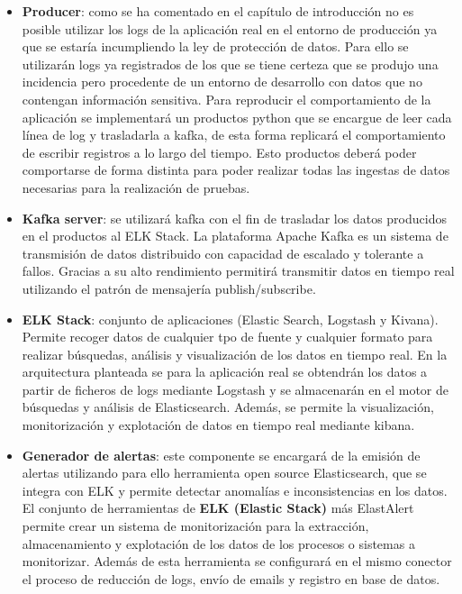 \begin{itemize}
\item \textbf{Producer}: como se ha comentado en el capítulo de introducción no es posible utilizar los logs de la aplicación real en el entorno de producción ya que se estaría incumpliendo la ley de protección de datos. Para ello se utilizarán logs ya registrados de los que se tiene certeza que se produjo una incidencia pero procedente de un entorno de desarrollo con datos que no contengan información sensitiva. Para reproducir el comportamiento de la aplicación se implementará un productos python que se encargue de leer cada línea de log y trasladarla a kafka, de esta forma replicará el comportamiento de escribir registros a lo largo del tiempo. Esto productos deberá poder comportarse de forma distinta para poder realizar todas las ingestas de datos necesarias para la realización de pruebas.

\item \textbf{Kafka server}: se utilizará kafka con el fin de trasladar los datos producidos en el productos al ELK Stack. La plataforma Apache Kafka es un sistema de transmisión de datos distribuido con capacidad de escalado y tolerante a fallos. Gracias a su alto rendimiento permitirá transmitir datos en tiempo real utilizando el patrón de mensajería publish/subscribe. 

\item \textbf{ELK Stack}: conjunto de aplicaciones (Elastic Search, Logstash y Kivana). Permite recoger datos de cualquier tpo de fuente y cualquier formato para realizar búsquedas, análisis y visualización de los datos en tiempo real. En la arquitectura planteada se para la aplicación real se obtendrán los datos a partir de ficheros de logs mediante Logstash y se almacenarán en el motor de búsquedas y análisis de Elasticsearch. Además, se permite la visualización, monitorización y explotación de datos en tiempo real mediante kibana.

\item \textbf{Generador de alertas}: este componente se encargará de la emisión de alertas utilizando para ello herramienta open source Elasticsearch, que se integra con ELK y permite detectar anomalías e inconsistencias en los datos. El conjunto de herramientas de \textbf{ELK (Elastic Stack)} más ElastAlert permite crear un sistema de monitorización para la extracción, almacenamiento y explotación de los datos de los procesos o sistemas a monitorizar. Además de esta herramienta se configurará en el mismo conector el proceso de reducción de logs, envío de emails y registro en base de datos.

\end{itemize}

